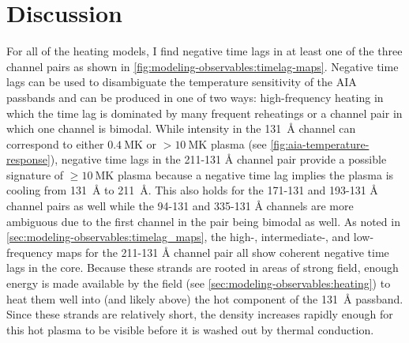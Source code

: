 \section{Discussion}\label{sec:modeling-observables:discussion}

For all of the heating models, I find negative time lags in at least one of the three channel pairs as shown in \autoref{fig:modeling-observables:timelag-maps}. Negative time lags can be used to disambiguate the temperature sensitivity of the AIA passbands and can be produced in one of two ways: high-frequency heating in which the time lag is dominated by many frequent reheatings or a channel pair in which one channel is bimodal. While intensity in the \SI{131}{\angstrom} channel can correspond to either $\SI{0.4}{\mega\kelvin}$ or $>\SI{10}{\mega\kelvin}$ plasma (see \autoref{fig:aia-temperature-response}), negative time lags in the 211-131 \si{\angstrom} channel pair provide a possible signature of $\ge\SI{10}{\mega\kelvin}$ plasma because a negative time lag implies the plasma is cooling from \SI{131}{\angstrom} to \SI{211}{\angstrom}. This also holds for the 171-131 and 193-131 \si{\angstrom} channel pairs as well while the 94-131 and 335-131 \si{\angstrom} channels are more ambiguous due to the first channel in the pair being bimodal as well. As noted in \autoref{sec:modeling-observables:timelag_maps}, the high-, intermediate-, and low-frequency maps for the 211-131 \si{\angstrom} channel pair all show coherent negative time lags in the core. Because these strands are rooted in areas of strong field, enough energy is made available by the field (see \autoref{sec:modeling-observables:heating}) to heat them well into (and likely above) the hot component of the \SI{131}{\angstrom} passband. Since these strands are relatively short, the density increases rapidly enough for this hot plasma to be visible before it is washed out by thermal conduction.

